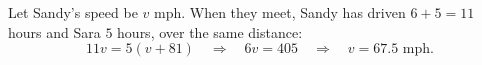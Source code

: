 Let Sandy's speed be $v$ mph. When they meet, Sandy has driven $6+5=11$ hours and Sara $5$ hours, over the same distance:
\[
11v=5(v+81)\quad\Longrightarrow\quad 6v=405\quad\Longrightarrow\quad v=\boxed{67.5\text{ mph}}.
\]
